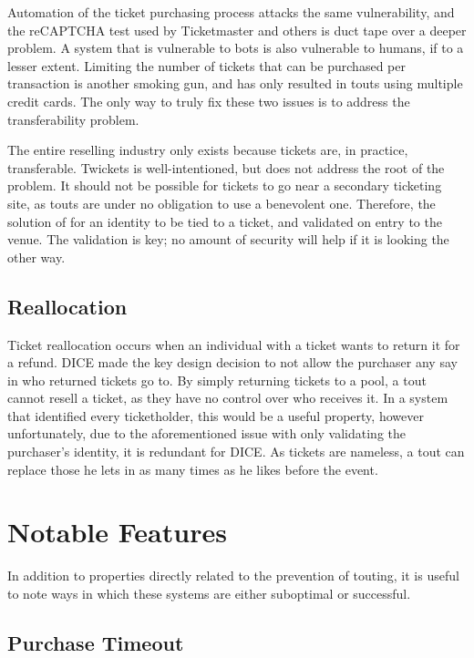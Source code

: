 \documentclass[12pt,a4]{bhamdissertation}
\begin{document}
Automation of the ticket purchasing process attacks the same vulnerability, and the reCAPTCHA test used by Ticketmaster and others is duct tape over a deeper problem. A system that is vulnerable to bots is also vulnerable to humans, if to a lesser extent. Limiting the number of tickets that can be purchased per transaction is another smoking gun, and has only resulted in touts using multiple credit cards. The only way to truly fix these two issues is to address the transferability problem.

The entire reselling industry only exists because tickets are, in practice, transferable. Twickets is well-intentioned, but does not address the root of the problem. It should not be possible for tickets to go near a secondary ticketing site, as touts are under no obligation to use a benevolent one. Therefore, the solution of for an identity to be tied to a ticket, and validated on entry to the venue. The validation is key; no amount of security will help if it is looking the other way.

\subsection{Reallocation}

Ticket reallocation occurs when an individual with a ticket wants to return it for a refund. DICE made the key design decision to not allow the purchaser any say in who returned tickets go to. By simply returning tickets to a pool, a tout cannot resell a ticket, as they have no control over who receives it. In a system that identified every ticketholder, this would be a useful property, however unfortunately, due to the aforementioned issue with only validating the purchaser's identity, it is redundant for DICE. As tickets are nameless, a tout can replace those he lets in as many times as he likes before the event. 

\section{Notable Features}

In addition to properties directly related to the prevention of touting, it is useful to note ways in which these systems are either suboptimal or successful.

\subsection{Purchase Timeout}
\end{document}
